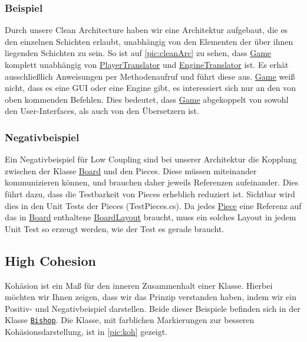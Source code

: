 \documentclass[
10pt, %
a4paper, %
oneside, %
headinclude,footinclude, %
BCOR5mm, %
]{scrartcl}
\begin{document}
\begin{onehalfspace}
\subsubsection{Beispiel}
Durch unsere Clean Architecture haben wir eine Architektur aufgebaut, die es den einzelnen Schichten erlaubt, unabhängig von den Elementen der über ihnen liegenden Schichten zu sein. So ist auf \autoref{pic:cleanArc} zu sehen, dass \href{https://github.com/schmida736/Chess-AdvancedSE/blob/main/Chess-AdvancedSE/Game\%20Elements/Game.cs}{Game} komplett unabhängig von \href{https://github.com/schmida736/Chess-AdvancedSE/blob/main/Chess-AdvancedSE/Translators/PlayerTranslator.cs}{PlayerTranslator} und \href{https://github.com/schmida736/Chess-AdvancedSE/blob/main/Chess-AdvancedSE/Translators/EngineTranslator.cs}{EngineTranslator} ist. Es erhät ausschließlich Anweisungen per Methodenaufruf und führt diese aus. \href{https://github.com/schmida736/Chess-AdvancedSE/blob/main/Chess-AdvancedSE/Game\%20Elements/Game.cs}{Game} weiß nicht, dass es eine GUI oder eine Engine gibt, es interessiert sich nur an den von oben kommenden Befehlen. Dies bedeutet, dass \href{https://github.com/schmida736/Chess-AdvancedSE/blob/main/Chess-AdvancedSE/Game\%20Elements/Game.cs}{Game} abgekoppelt von sowohl den User-Interfaces, als auch von den Übersetzern ist.

\subsubsection{Negativbeispiel}
Ein Negativbeispiel für Low Coupling sind bei unserer Architektur die Kopplung zwischen der Klasse \href{https://github.com/schmida736/Chess-AdvancedSE/blob/main/Chess-AdvancedSE/Game\%20Elements/Board.cs}{Board} und den Pieces. Diese müssen miteinander kommunizieren können, und brauchen daher jeweils Referenzen aufeinander. Dies führt dazu, dass die Testbarkeit von Pieces erheblich reduziert ist. Sichtbar wird dies in den Unit Tests der Pieces (TestPieces.cs). Da jedes \href{https://github.com/schmida736/Chess-AdvancedSE/blob/main/Chess-AdvancedSE/Game\%20Elements/Pieces/Piece.cs}{Piece} eine Referenz auf das in \href{https://github.com/schmida736/Chess-AdvancedSE/blob/main/Chess-AdvancedSE/Game\%20Elements/Board.cs}{Board} enthaltene \href{https://github.com/schmida736/Chess-AdvancedSE/blob/main/Chess-AdvancedSE/Game\%20Elements/BoardLayout.cs}{BoardLayout} braucht, muss ein solches Layout in jedem Unit Test so erzeugt werden, wie der Test es gerade braucht.

\subsection{High Cohesion}
Kohäsion ist ein Maß für den inneren Zusammenhalt einer Klasse. Hierbei möchten wir Ihnen zeigen, dass wir das Prinzip verstanden haben, indem wir ein Positiv- und Negativbeispiel darstellen. Beide dieser Beispiele befinden sich in der Klasse \texttt{\href{https://github.com/schmida736/Chess-AdvancedSE/blob/main/Chess-AdvancedSE/Game\%20Elements/Pieces/Bishop.cs}{Bishop}}. Die Klasse, mit farblichen Markierungen zur besseren Kohäsionsdarstellung, ist in \autoref{pic:koh} gezeigt.


\end{onehalfspace}
\end{document}
